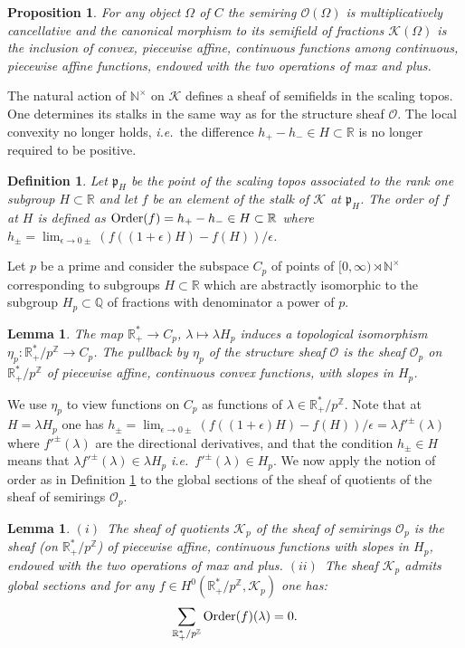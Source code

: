 \documentclass{elsart3-1}
\newtheorem{lemma}[theorem]{Lemma}
\newtheorem{e-proposition}[theorem]{Proposition}
\newtheorem{e-definition}[theorem]{Definition\rm}
\def\N{{\mathbb N}}
\def\Q{{\mathbb Q}}
\def\R{{\mathbb R}}
\def\Z{{\mathbb Z}}
\def\cK{{\mathcal K}}
\def\cO{{\mathcal O}}
\newcommand{\ie}{{\it i.e.\/}\ }
\def\ffp{\mathfrak{p}}
\def\mc{multiplicatively cancellative }
\def\nt{\N^{\times}}
\def\rnt{{[0,\infty)\rtimes{\N^{\times}}}}
\def\vsp{\vspace{.05in}}
\begin{document}
\begin{e-proposition}\label{tensring} 
For any object $\Omega$ of $C$ the semiring $\cO(\Omega)$ is \mc and the canonical morphism to its semifield of fractions $\cK(\Omega)$ is the inclusion of convex, piecewise affine, continuous functions among continuous, piecewise affine functions, endowed with the two operations of max and plus.
\end{e-proposition}\vsp
The natural action of $\nt$ on  $\cK$ defines a sheaf of semifields in the scaling topos. One determines its stalks in the same way as for the structure sheaf $\cO$. The local convexity no longer holds, \ie the difference $h_+-h_-\in H\subset \R$ is no longer required to be positive.
\vsp
\begin{e-definition}\label{site2} Let $\ffp_H$ be the point of the scaling topos associated to the rank one subgroup $H\subset \R$ and let $f$ be an element of the stalk of $\cK$ at $\ffp_H$. The order of $f$ at $H$ is defined as ${\rm Order}(f)=h_+-h_-\in H\subset \R$ where $h_
\pm=\lim_{\epsilon\to 0\pm}(f((1+\epsilon) H)-f(H))/\epsilon$.
\end{e-definition}
\vsp
Let $p$ be a prime and consider the subspace $C_p$ of points of  $\rnt$ corresponding to subgroups $H\subset \R$ which are abstractly isomorphic to the subgroup $H_p\subset \Q$ of fractions with denominator a power of $p$. 
\vsp
\begin{lemma}\label{periodp} The map $\R_+^*\to C_p$,  $\lambda\mapsto\lambda H_p$ induces a topological isomorphism $\eta_p: \R_+^*/p^\Z\to C_p$. The pullback by $\eta_p$ of the structure sheaf $\cO$ is the sheaf $\cO_p$ on $\R_+^*/p^\Z$ of piecewise affine, continuous convex functions, with slopes in $H_p$.
\end{lemma}
\vsp
We use $\eta_p$ to view functions on $C_p$ as functions of $\lambda\in \R_+^*/p^\Z$. Note that at $H=\lambda H_p$ one has  $h_
\pm=\lim_{\epsilon\to 0\pm}(f((1+\epsilon) H)-f(H))/\epsilon=\lambda f'^\pm(\lambda)$ where $f'^\pm(\lambda)$ are the directional derivatives, and that the condition $h_\pm\in H$ means that $\lambda f'^\pm(\lambda)\in \lambda H_p$ \ie $f'^\pm(\lambda)\in  H_p$. We now apply the notion of order as in Definition \ref{site2} to the global sections of the sheaf of quotients of the sheaf of semirings $\cO_p$.
\vsp
\begin{lemma}\label{periodpbis} $(i)$~The sheaf of quotients $\cK_p$ of the sheaf of semirings $\cO_p$ is the sheaf  (on $\R_+^*/p^\Z$) of piecewise affine, continuous  functions with slopes in $H_p$,  endowed with the two operations of max and plus. \newline
$(ii)$~The sheaf $\cK_p$ admits global sections and for any $f\in H^0(\R_+^*/p^\Z,\cK_p)$ one has: 
\begin{equation*}%
\sum_{\R_+^*/p^\Z} {\rm Order}(f)(\lambda)=0.
\end{equation*}
\end{lemma}
\end{document}

